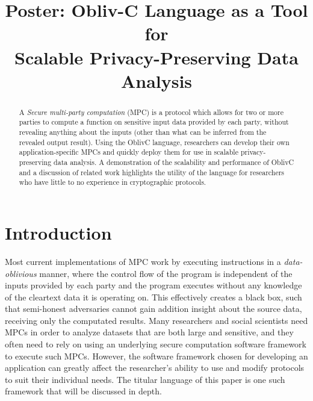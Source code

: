 \documentclass[conference]{IEEEtran}
\begin{document}
\title{Poster: Obliv-C Language as a Tool for \\Scalable Privacy-Preserving Data Analysis}

\author{
}

\maketitle


\begin{abstract}
A \emph{Secure multi-party computation} (MPC) is a protocol which allows for two or more parties to compute a function on sensitive input data provided by each party, without revealing anything about the inputs (other than what can be inferred from the revealed output result). 
Using the OblivC language, researchers can develop their own application-specific
MPCs and quickly deploy them for use in scalable privacy-preserving data analysis.
A demonstration of the scalability and performance of OblivC and a discussion of
related work highlights the utility of the language for researchers who have little
to no experience in cryptographic protocols. 
\end{abstract}

\section{Introduction}
Most current implementations of MPC work by executing instructions in a \emph{data-oblivious} manner, where the control flow of the program is independent of the 
inputs provided by each party and the program executes without any 
knowledge of the cleartext data it is operating on.
This effectively creates a black box, such that semi-honest adversaries cannot gain addition insight about the source data, receiving only the computated results.
Many researchers and social scientists need MPCs in order to analyze datasets that are 
both large and sensitive, and they often need to rely on using an underlying secure computation software framework to execute such MPCs.
However, the software framework chosen for developing an application can greatly
affect the researcher's ability to use and modify protocols to suit their individual needs.
The titular language of this paper is one such framework that will be discussed in depth.
\end{document}
